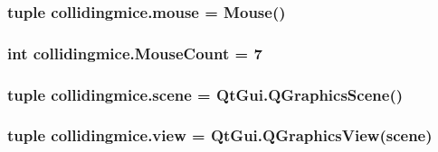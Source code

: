 \subsubsection[{mouse}]{\setlength{\rightskip}{0pt plus 5cm}tuple collidingmice.\+mouse = {\bf Mouse}()}\label{namespacecollidingmice_a5b37737f72e07902bc9ec51213191963}
\hypertarget{namespacecollidingmice_aa450d8145b22476797ec5081b2546b01}{}
\subsubsection[{Mouse\+Count}]{\setlength{\rightskip}{0pt plus 5cm}int collidingmice.\+Mouse\+Count = 7}\label{namespacecollidingmice_aa450d8145b22476797ec5081b2546b01}
\hypertarget{namespacecollidingmice_a912eae13e653411ba83d22c6a723f8c5}{}
\subsubsection[{scene}]{\setlength{\rightskip}{0pt plus 5cm}tuple collidingmice.\+scene = Qt\+Gui.\+Q\+Graphics\+Scene()}\label{namespacecollidingmice_a912eae13e653411ba83d22c6a723f8c5}
\hypertarget{namespacecollidingmice_aa8f3acfbd3fd7eec3aa1372a11f6a53f}{}
\subsubsection[{view}]{\setlength{\rightskip}{0pt plus 5cm}tuple collidingmice.\+view = Qt\+Gui.\+Q\+Graphics\+View({\bf scene})}\label{namespacecollidingmice_aa8f3acfbd3fd7eec3aa1372a11f6a53f}

